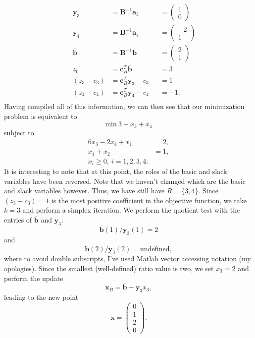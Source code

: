 \documentclass[12pt,english]{article}
\begin{document}
$$
\begin{aligned}
&&\mathbf{y}_3 	&= 	\mathbf{B}^{-1} \mathbf{a}_3 	&&= \left(\begin{array}{c} 1 \\ 0 \end{array}\right)	\\
&&\mathbf{y}_4 	&=	\mathbf{B}^{-1} \mathbf{a}_4 	&&= \left(\begin{array}{c} -2 \\ 1\end{array}\right)	\\
&&\overline{\mathbf{b}}	&=	\mathbf{B}^{-1} \mathbf{b} &&= \left(\begin{array}{c} 2 \\ 1 \end{array}\right) \\
&&z_0 &= \mathbf{c}_B^T \overline{\mathbf{b}} &&=3 \\
&&(z_3 - c_3) &=	\mathbf{c}_B^T \mathbf{y}_3 - c_3 &&=1\\
&&(z_4 - c_4) &=  \mathbf{c}_B^T \mathbf{y}_4 - c_4 &&=-1.\\
\end{aligned}
$$
Having compiled all of this information, we can then see that our minimization problem is equivalent to
$$
\text{min}~ 3-x_3+x_4
$$
subject to
\begin{alignat*}{6}
x_3 - 2x_4 + x_1 &=2, \\
x_4 + x_2		   &=1, \\
x_i \geq 0, ~ i=1,2,3,4.
\end{alignat*}
It is interesting to note that at this point, the roles of the basic and slack variables have been reversed.  Note that we haven't changed which are the basic and slack variables however.  Thus, we have still have $R = \{ 3, 4\}$.  Since $(z_3 - c_3) = 1$ is the most positive coefficient in the objective function, we take $k=3$ and perform a simplex iteration.  We perform the quotient test with the entries of $\overline{\mathbf{b}}$ and $\mathbf{y}_3$:
$$
\overline{\mathbf{b}}(1) / \mathbf{y}_3(1) = 2
$$
and 
$$
\overline{\mathbf{b}}(2) / \mathbf{y}_3(2) = \text{undefined},
$$
where to avoid double subscripts, I've used Matlab vector accessing notation (my apologies).  Since the smallest (well-defined) ratio value is two, we set $x_3 = 2$ and perform the update
$$
\mathbf{x}_B = \overline{\mathbf{b}} - \mathbf{y}_3 x_3,
$$
leading to the new point
$$
\mathbf{x} = 
\left(
\begin{array}{c}
0 \\
1 \\
2 \\
0
\end{array}
\right).
$$
\end{document}
